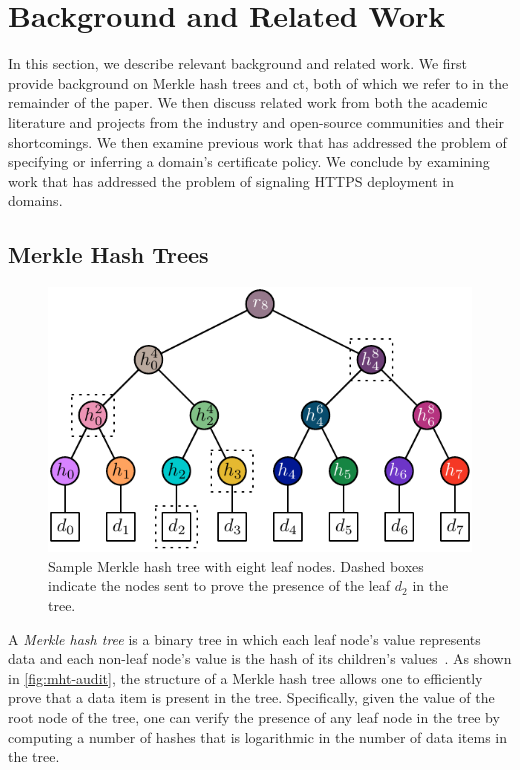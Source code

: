 \section{Background and Related Work}
\label{sec:background}

In this section, we describe relevant background and related work. We first
provide background on Merkle hash trees and \acl{ct}, both of which we refer to
in the remainder of the paper. We then discuss related work from both the
academic literature and projects from the industry and open-source communities
and their shortcomings. We then examine previous work that has addressed the
problem of specifying or inferring a domain's certificate policy. We conclude by
examining work that has addressed the problem of signaling HTTPS deployment in
domains.

\subsection{Merkle Hash Trees}
\label{sec:background:mht}


\begin{figure}
  \centering
  \includegraphics[width=\linewidth]{fig/mht-audit}
  \caption{Sample Merkle hash tree with eight leaf nodes. Dashed boxes indicate
  the nodes sent to prove the presence of the leaf $d_2$ in the tree.}
  \label{fig:mht-audit}
\end{figure}

A \emph{Merkle hash tree} is a binary tree in which each leaf node's value
represents data and each non-leaf node's value is the hash of its children's
values~\cite{merkle1988digital}. As shown in \autoref{fig:mht-audit}, the
structure of a Merkle hash tree allows one to efficiently prove that a data item
is present in the tree. Specifically, given the value of the root node of the
tree, one can verify the presence of any leaf node in the tree by computing a
number of hashes that is logarithmic in the number of data items in the tree.

